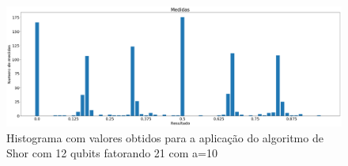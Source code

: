 \documentclass[12pt,a4paper]{article}
\begin{document}
\begin{figure}[h]
    \centering
    \includegraphics[width=1\textwidth]{relatorio-shor2.png}
    \caption{Histograma com valores obtidos para a aplicação do algoritmo de Shor com 12 qubits fatorando 21 com a=10}
    \label{fig:Shor1}
\end{figure}







     





     
\end{document}
